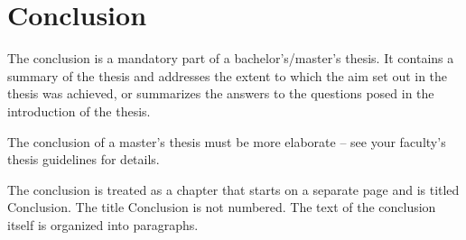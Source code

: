 \chapter*{Conclusion}

The conclusion is a mandatory part of a bachelor's/master's thesis. It contains a summary of the thesis and addresses the extent to which the aim set out in the thesis was achieved, or summarizes the answers to the questions posed in the introduction of the thesis.

The conclusion of a master's thesis must be more elaborate -- see your faculty's thesis guidelines for details.

The conclusion is treated as a chapter that starts on a separate page and is titled Conclusion. The title Conclusion is not numbered. The text of the conclusion itself is organized into paragraphs.
